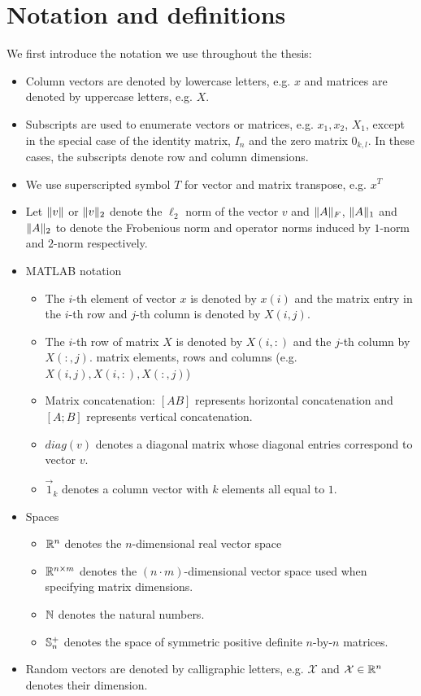 %
\chapter{Notation and definitions}\label{chap:notation}

We first introduce the notation we use throughout the thesis:
\begin{itemize}
\item Column vectors are denoted by lowercase letters, e.g. $x$ and matrices are denoted by uppercase letters, e.g. $X$.
\item Subscripts are used to enumerate vectors or matrices, e.g. $x_1, x_2$, $X_1$, except in the
special case of the identity matrix, $I_n$ and the zero matrix $0_{k,l}$. In these cases, the subscripts denote row and column dimensions.
\item We use superscripted symbol $T$ for vector and matrix transpose, e.g. $x^T$
\item Let $\lVert v\rVert$ or $\lVert v\rVert_2$ denote the $\ell_2$ norm of the vector $v$ and $\lVert A\rVert_F$, $\lVert A\rVert_1$ and $\lVert A\rVert_2$ to denote the Frobenious norm and operator norms induced by $1$-norm and $2$-norm respectively.
\item MATLAB notation~\cite{golub}
\begin{itemize}
\item The $i$-th element of vector $x$ is denoted by $x(i)$ and the matrix entry in the $i$-th row and $j$-th column is denoted by $X(i,j)$.
\item The $i$-th row of matrix $X$ is denoted by $X(i,:)$ and the $j$-th column by $X(:,j)$.
 matrix elements, rows and columns {(e.g. ${X(i,j), X(i,:), X(:,j)}$)}
\item Matrix concatenation: $[A B]$ represents horizontal concatenation and $[A; B]$ represents vertical concatenation.
\item $diag(v)$ denotes a diagonal matrix whose diagonal entries correspond to vector $v$.
\item $\vec{1}_k$ denotes a column vector with $k$ elements all equal to $1$.
\end{itemize}
\item Spaces
\begin{itemize}
 \item $\mathbb{R}^n$ denotes the $n$-dimensional real vector space
 \item $\mathbb{R}^{n\times m}$ denotes the $(n \cdot m)$-dimensional vector space used when specifying
 matrix dimensions.
 \item $\mathbb{N}$ denotes the natural numbers.
 \item $\mathbb{S}_n^{+}$ denotes the space of symmetric positive definite $n$-by-$n$ matrices.
\end{itemize}
\item Random vectors are denoted by calligraphic letters, e.g. $\mathcal{X}$ and $\mathcal{X} \in \mathbb{R}^n$ denotes their dimension.
\end{itemize}


